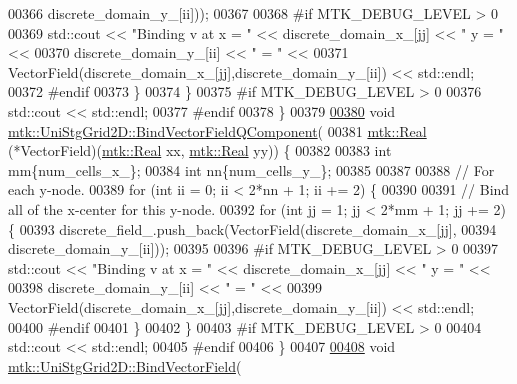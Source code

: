 \begin{DoxyCode}
00366                                             discrete\_domain\_y\_[ii]));
00367 
00368 \textcolor{preprocessor}{      #if MTK\_DEBUG\_LEVEL > 0}
00369       std::cout << \textcolor{stringliteral}{"Binding v at x = "} << discrete\_domain\_x\_[jj] << \textcolor{stringliteral}{" y = "} <<
00370         discrete\_domain\_y\_[ii] << \textcolor{stringliteral}{" = "} <<
00371         VectorField(discrete\_domain\_x\_[jj],discrete\_domain\_y\_[ii]) << std::endl;
00372 \textcolor{preprocessor}{      #endif}
00373     \}
00374   \}
00375 \textcolor{preprocessor}{  #if MTK\_DEBUG\_LEVEL > 0}
00376   std::cout << std::endl;
00377 \textcolor{preprocessor}{  #endif}
00378 \}
00379 
\hypertarget{mtk__uni__stg__grid__2d_8cc_source_l00380}{}\hyperlink{classmtk_1_1UniStgGrid2D_a8b7ae23231a4a694073b6c22715a4375}{00380} \textcolor{keywordtype}{void} \hyperlink{classmtk_1_1UniStgGrid2D_a8b7ae23231a4a694073b6c22715a4375}{mtk::UniStgGrid2D::BindVectorFieldQComponent}(
00381   \hyperlink{group__c01-roots_gac080bbbf5cbb5502c9f00405f894857d}{mtk::Real} (*VectorField)(\hyperlink{group__c01-roots_gac080bbbf5cbb5502c9f00405f894857d}{mtk::Real} xx, \hyperlink{group__c01-roots_gac080bbbf5cbb5502c9f00405f894857d}{mtk::Real} yy)) \{
00382 
00383   \textcolor{keywordtype}{int} mm\{num\_cells\_x\_\};
00384   \textcolor{keywordtype}{int} nn\{num\_cells\_y\_\};
00385 
00387 
00388   \textcolor{comment}{// For each y-node.}
00389   \textcolor{keywordflow}{for} (\textcolor{keywordtype}{int} ii = 0; ii < 2*nn + 1; ii += 2) \{
00390 
00391     \textcolor{comment}{// Bind all of the x-center for this y-node.}
00392     \textcolor{keywordflow}{for} (\textcolor{keywordtype}{int} jj = 1; jj < 2*mm + 1; jj += 2) \{
00393       discrete\_field\_.push\_back(VectorField(discrete\_domain\_x\_[jj],
00394                                             discrete\_domain\_y\_[ii]));
00395 
00396 \textcolor{preprocessor}{      #if MTK\_DEBUG\_LEVEL > 0}
00397       std::cout << \textcolor{stringliteral}{"Binding v at x = "} << discrete\_domain\_x\_[jj] << \textcolor{stringliteral}{" y = "} <<
00398         discrete\_domain\_y\_[ii] << \textcolor{stringliteral}{" = "} <<
00399         VectorField(discrete\_domain\_x\_[jj],discrete\_domain\_y\_[ii]) << std::endl;
00400 \textcolor{preprocessor}{      #endif}
00401     \}
00402   \}
00403 \textcolor{preprocessor}{  #if MTK\_DEBUG\_LEVEL > 0}
00404   std::cout << std::endl;
00405 \textcolor{preprocessor}{  #endif}
00406 \}
00407 
\hypertarget{mtk__uni__stg__grid__2d_8cc_source_l00408}{}\hyperlink{classmtk_1_1UniStgGrid2D_a1cba89c285973514c1351760d598c52b}{00408} \textcolor{keywordtype}{void} \hyperlink{classmtk_1_1UniStgGrid2D_a1cba89c285973514c1351760d598c52b}{mtk::UniStgGrid2D::BindVectorField}(

\end{DoxyCode}
